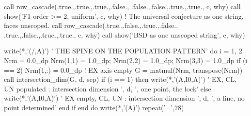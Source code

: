 \documentclass[10pt,twocolumn]{article}
\newenvironment{Shaded}{}{}
\newcommand{\BuiltInTok}[1]{#1}
\newcommand{\CommentTok}[1]{#1}
\newcommand{\ConstantTok}[1]{#1}
\newcommand{\DecValTok}[1]{#1}
\newcommand{\FloatTok}[1]{#1}
\newcommand{\FunctionTok}[1]{#1}
\newcommand{\KeywordTok}[1]{#1}
\newcommand{\NormalTok}[1]{#1}
\newcommand{\OperatorTok}[1]{#1}
\newcommand{\StringTok}[1]{#1}
\providecommand{\BuiltInTok}[1]{#1}
\providecommand{\CommentTok}[1]{#1}
\providecommand{\ConstantTok}[1]{#1}
\providecommand{\DecValTok}[1]{#1}
\providecommand{\FloatTok}[1]{#1}
\providecommand{\FunctionTok}[1]{#1}
\providecommand{\KeywordTok}[1]{#1}
\providecommand{\NormalTok}[1]{#1}
\providecommand{\OperatorTok}[1]{#1}
\providecommand{\StringTok}[1]{#1}
\providecommand{\textquotesingle}{'}
\providecommand{\BuiltInTok}[1]{#1}
\providecommand{\CommentTok}[1]{#1}
\providecommand{\ConstantTok}[1]{#1}
\providecommand{\DecValTok}[1]{#1}
\providecommand{\FloatTok}[1]{#1}
\providecommand{\FunctionTok}[1]{#1}
\providecommand{\KeywordTok}[1]{#1}
\providecommand{\NormalTok}[1]{#1}
\providecommand{\OperatorTok}[1]{#1}
\providecommand{\StringTok}[1]{#1}
\begin{document}
\begin{strip}
\begin{Shaded}
\begin{Highlighting}[]
  \KeywordTok{call}\NormalTok{ row\_cascade(}\ConstantTok{.true.}\NormalTok{,}\ConstantTok{.true.}\NormalTok{,}\ConstantTok{.true.}\NormalTok{,}\ConstantTok{.false.}\NormalTok{, }\ConstantTok{.false.}\NormalTok{,}\ConstantTok{.false.}\NormalTok{,}\ConstantTok{.true.}\NormalTok{,}\CommentTok{.true., c, why)}
  \KeywordTok{call}\NormalTok{ show(}\StringTok{\textquotesingle{}F1  order \textgreater{}= 2, uniform\textquotesingle{}}\NormalTok{, c, why)}
  \CommentTok{! The universal conjecture as one string, faces unscoped.}
  \KeywordTok{call}\NormalTok{ row\_cascade(}\ConstantTok{.true.}\NormalTok{,}\ConstantTok{.false.}\NormalTok{,}\ConstantTok{.true.}\NormalTok{,}\ConstantTok{.false.}\NormalTok{, }\ConstantTok{.true.}\NormalTok{,}\ConstantTok{.false.}\NormalTok{,}\ConstantTok{.true.}\NormalTok{,}\CommentTok{.true., c, why)}
  \KeywordTok{call}\NormalTok{ show(}\StringTok{\textquotesingle{}BSD as one unscoped string\textquotesingle{}}\NormalTok{, c, why)}

  \FunctionTok{write(*}\NormalTok{,}\StringTok{\textquotesingle{}(/,A)\textquotesingle{}}\FunctionTok{)} \StringTok{\textquotesingle{} THE SPINE ON THE POPULATION PATTERN\textquotesingle{}}
  \KeywordTok{do}\NormalTok{ i }\KeywordTok{=} \DecValTok{1}\NormalTok{, }\DecValTok{2}
\BuiltInTok{     N}\NormalTok{rm }\KeywordTok{=} \FloatTok{0.0\_dp}
\BuiltInTok{     N}\NormalTok{rm(}\DecValTok{1}\NormalTok{,}\DecValTok{1}\NormalTok{) }\KeywordTok{=} \FloatTok{1.0\_dp}\NormalTok{; Nrm(}\DecValTok{2}\NormalTok{,}\DecValTok{2}\NormalTok{) }\KeywordTok{=} \FloatTok{1.0\_dp}\NormalTok{; Nrm(}\DecValTok{3}\NormalTok{,}\DecValTok{3}\NormalTok{) }\KeywordTok{=} \FloatTok{1.0\_dp}
\BuiltInTok{     i}\NormalTok{f (i }\OperatorTok{==} \DecValTok{2}\NormalTok{) Nrm(}\DecValTok{1}\NormalTok{,:) }\KeywordTok{=} \FloatTok{0.0\_dp}                    \CommentTok{! EX axis empty}
\BuiltInTok{     G} \KeywordTok{=} \FunctionTok{matmul}\NormalTok{(Nrm, }\FunctionTok{transpose}\NormalTok{(Nrm))}
\BuiltInTok{     c}\NormalTok{all intersection\_dim(G, d, sep)}
\BuiltInTok{     i}\NormalTok{f (i }\OperatorTok{==} \DecValTok{1}\NormalTok{) }\KeywordTok{then}
        \FunctionTok{write(*}\NormalTok{,}\StringTok{\textquotesingle{}(A,I0,A)\textquotesingle{}}\FunctionTok{)} \StringTok{\textquotesingle{}   EX, CL, UN populated    : intersection dimension \textquotesingle{}}\NormalTok{, d, }\StringTok{\textquotesingle{}, one point, the lock\textquotesingle{}}
\BuiltInTok{     e}\NormalTok{lse}
        \FunctionTok{write(*}\NormalTok{,}\StringTok{\textquotesingle{}(A,I0,A)\textquotesingle{}}\FunctionTok{)} \StringTok{\textquotesingle{}   EX empty, CL, UN        : intersection dimension \textquotesingle{}}\NormalTok{, d, }\StringTok{\textquotesingle{}, a line, no point determined\textquotesingle{}}
\BuiltInTok{     e}\NormalTok{nd }\KeywordTok{if}
  \KeywordTok{end do}
  \FunctionTok{write(*}\NormalTok{,}\StringTok{\textquotesingle{}(A)\textquotesingle{}}\FunctionTok{)} \FunctionTok{repeat}\NormalTok{(}\StringTok{\textquotesingle{}=\textquotesingle{}}\NormalTok{,}\DecValTok{78}\NormalTok{)}


\end{Highlighting}
\end{Shaded}
\end{strip}
\end{document}
